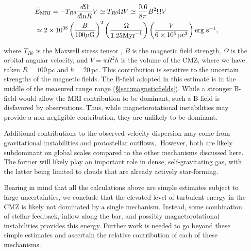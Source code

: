 \begin{footnotesize}
\begin{align}
    & \dot{E}_{\rm MRI} = -T_{R\theta}\frac{d\Omega}{d\mathrm{ln}R}V \simeq T_{R\theta}\Omega V \simeq \frac{0.6}{8\pi}B^{2}\Omega V \nonumber \\
    & \simeq 2 \times 10^{38} \left( \frac{B}{100 \mu \mathrm{G}} \right)^2 \left(\frac{\Omega}{1.25 \mbox{${\rm Myr}$}^{-1}}\right) \left( \frac{V}{6 \times 10^5 \, \mbox{${\rm pc}$}^3} \right) \mbox{${\rm erg}~{\rm s}^{-1}$},
\end{align}

\end{footnotesize}
%
where $T_{R\theta}$ is the Maxwell stress tensor \citep[the approximation $T_{R\theta}\simeq \frac{0.6}{8\pi}B^{2}$ is determined from numerical models;][]{Hawley1995}, $B$ is the magnetic field strength, $\Omega$ is the orbital angular velocity, and $V=\pi R^{2}h$ is the volume of the CMZ, where we have taken $R=100$\,pc and $h=20$\,pc. 
This contribution is sensitive to the uncertain strengths of the magnetic fields. The B-field adopted in this estimate is in the middle of the measured range range (\S \ref{sec:magneticfields}).
While a stronger B-field would allow the MRI contribution to be dominant, such a B-field is disfavored by observations. Thus, while magnetorotational instabilities may provide a non-negligible contribution, they are unlikely to be dominant. 

Additional contributions to the observed velocity dispersion may come from gravitational instabilities and protostellar outflows,\citep{MacLow2004,Kruijssen2014a}. However, both are likely subdominant on global scales compared to the other mechanisms discussed here. The former will likely play an important role in dense, self-gravitating gas, with the latter being limited to clouds that are already actively star-forming.

Bearing in mind that all the calculations above are simple estimates subject to large uncertainties, we conclude that the elevated level of turbulent energy in the CMZ is likely not dominated by a single mechanism.  Instead, some combination of stellar feedback, inflow along the bar, and possibly magnetorotational instabilities provides this energy. Further work is needed to go beyond these simple estimates and ascertain the relative contribution of each of these mechanisms. 